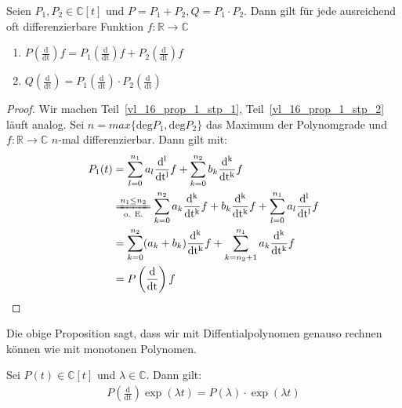 \begin{Proposition}{\label{vl_16_prop_1}
	Seien $P_1, P_2 \in \mathbb{C}[t]$ und $P=P_1 + P_2, Q = P_1 \cdot P_2$. 
	Dann gilt für jede ausreichend oft differenzierbare Funktion $f : \mathbb{R} 
	\rightarrow \mathbb{C}$
	\begin{enumerate}
		\item \label{vl_16_prop_1_stp_1} $P\left(\frac{\mathrm{d}}{\mathrm{dt}}\right) f = 
		P_1\left( \frac{\mathrm{d}}{\mathrm{dt}} \right) f + P_2 
		\left( \frac{\mathrm{d}}{\mathrm{dt}} \right) f$
		\item \label{vl_16_prop_1_stp_2} $Q \left(\frac{\mathrm{d}}{\mathrm{dt}}\right) = 
		P_1\left( \frac{\mathrm{d}}{\mathrm{dt}} \right) \cdot 
		P_2 \left( \frac{\mathrm{d}}{\mathrm{dt}} \right)$
	\end{enumerate}
}\end{Proposition}

\begin{proof}
	Wir machen Teil~\ref{vl_16_prop_1_stp_1}, Teil~\ref{vl_16_prop_1_stp_2} läuft analog.
	 Sei $n = max\{\mathrm{deg}P_1, \mathrm{deg}P_2\}$ das Maximum der Polynomgrade und 
	 $f: \mathbb{R} \rightarrow \mathbb{C}$ $n$-mal differenzierbar. 
	 Dann gilt mit: 
	 \begin{align*}
	 	P_1(t) & = \sum_{l=0}^{n_1}a_l 
		\frac{\mathrm{d^l}}{\mathrm{dt^l}} f + \sum_{k = 0}^{n_2} b_k 
		\frac{\mathrm{d^k}}{\mathrm{dt^k}}f \\
		& \xlongequal[\text{o. E.}]{n_1 \leq n_2} 
	 	\sum_{k=0}^{n_2}a_k \frac{\mathrm{d^k}}{\mathrm{dt^k}} f + b_k 
	 	\frac{\mathrm{d^k}}{\mathrm{dt^k}}f + 
		\sum_{l= 0}^{n_1} a_l \frac{\mathrm{d^l}}{\mathrm{dt^l}}f \\
		& =  \sum_{k=0}^{n_2}(a_k+b_k) \frac{\mathrm{d^k}}{\mathrm{dt^k}}f + 
		\sum_{k=n_2+1}^{n_1}a_k \frac{\mathrm{d^k}}{\mathrm{dt^k}} f \\
		& = P\left(\frac{\mathrm{d}}{\mathrm{dt}}\right)f
	\end{align*}
\end{proof}

\begin{Bemerkung}{
	Die obige Proposition sagt, dass wir mit Diffentialpolynomen genauso rechnen 
	können wie mit \glqq monotonen\grqq{} Polynomen.
}\end{Bemerkung}

\begin{Proposition}{
	Sei $P(t) \in \mathbb{C}[t]$ und $\lambda\in \mathbb{C}$. Dann gilt:
	\begin{align*}
		P\left(\frac{\mathrm{d}}{\mathrm{dt}}\right)\exp(\lambda t) = 
		P(\lambda)\cdot\exp(\lambda t)
	\end{align*}
}\end{Proposition}

